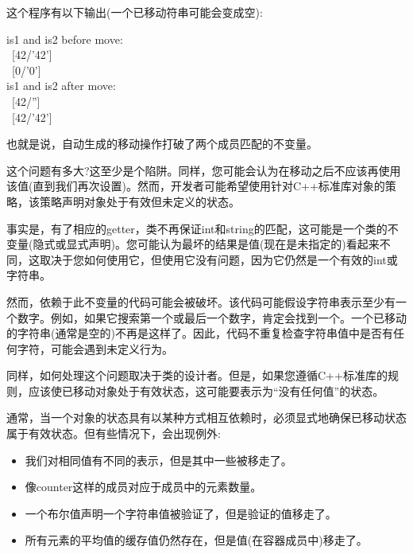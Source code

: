 这个程序有以下输出(一个已移动符串可能会变成空):\par

\begin{tcolorbox}[colback=white,colframe=black]
is1 and is2 before move: \\
\ [42/'42'] \\
\ [0/'0'] \\
is1 and is2 after move: \\
\ [42/''] \\
\ [42/'42']
\end{tcolorbox}

也就是说，自动生成的移动操作打破了两个成员匹配的不变量。\par

这个问题有多大?这至少是个陷阱。同样，您可能会认为在移动之后不应该再使用该值(直到我们再次设置)。然而，开发者可能希望使用针对C++标准库对象的策略，该策略声明对象处于有效但未定义的状态。\par

事实是，有了相应的getter，类不再保证int和string的匹配，这可能是一个类的不变量(隐式或显式声明)。您可能认为最坏的结果是值(现在是未指定的)看起来不同，这取决于您如何使用它，但使用它没有问题，因为它仍然是一个有效的int或字符串。\par

然而，依赖于此不变量的代码可能会被破坏。该代码可能假设字符串表示至少有一个数字。例如，如果它搜索第一个或最后一个数字，肯定会找到一个。一个已移动的字符串(通常是空的)不再是这样了。因此，代码不重复检查字符串值中是否有任何字符，可能会遇到未定义行为。\par

同样，如何处理这个问题取决于类的设计者。但是，如果您遵循C++标准库的规则，应该使已移动对象处于有效状态，这可能要表示为“没有任何值”的状态。\par

通常，当一个对象的状态具有以某种方式相互依赖时，必须显式地确保已移动状态属于有效状态。但有些情况下，会出现例外:\par

\begin{itemize}
	\item 我们对相同值有不同的表示，但是其中一些被移走了。
	\item 像counter这样的成员对应于成员中的元素数量。
	\item 一个布尔值声明一个字符串值被验证了，但是验证的值移走了。
	\item 所有元素的平均值的缓存值仍然存在，但是值(在容器成员中)移走了。
\end{itemize}

